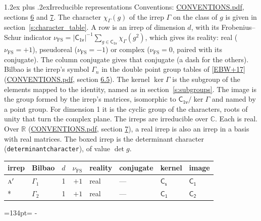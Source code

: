 \documentclass[10pt,a4paper]{article}
\makeatletter
\renewcommand\section{\@startsection{section}{1}{\z@}{-3ex plus -1ex minus -.2ex}%
  {1.2ex plus .2ex}{\normalfont\large\sffamily\bfseries\color{parttitle}}}
\newcommand{\needspace}[1]{\par\penalty-100\begingroup\dimen0=#1\relax\dimen2=\pagegoal
  \advance\dimen2-\pagetotal\ifdim\dimen0>\dimen2\relax\ifdim\dimen2>0pt\vfil\break\fi\fi
  \endgroup}
\numberwithin{equation}{section}
\newcommand{\grp}[1]{\mathsf{#1}}
\newcommand{\irr}[1]{\text{\normalfont\scshape #1}}
\newcommand{\detbox}[1]{{\setlength{\fboxsep}{1pt}\fbox{#1}}}
\newcommand{\irchar}[1]{\chi_{#1}}
\newcommand{\fsind}{\nu_{\mathrm{FS}}}
\makeatother
\begin{document}
\section{Irreducible representations}\label{s:irreps}
Conventions: \href{../../CONVENTIONS.pdf}{CONVENTIONS.pdf}, sections \href{../../CONVENTIONS.pdf\#conv.6}{6} and \href{../../CONVENTIONS.pdf\#conv.7}{7}.
\leavevmode\label{n:function.character}\label{n:irrep.Gamma}The character $\irchar{\Gamma}(g)$ of the irrep $\Gamma$ on the class of $g$ is given in section~\ref{s:character_table}.
\leavevmode\label{n:index.dimension}\label{n:index.frobenius}\label{n:head.irrep}\label{n:head.reality}A row is an irrep of dimension $d$, with its Frobenius--Schur indicator $\fsind = |\grp{C_{1v}}|^{-1}\allowbreak\sum_{g\in\grp{C_{1v}}}\irchar{\Gamma}(g^2)$, which gives its reality: real ($\fsind = +1$), pseudoreal ($\fsind = -1$) or complex ($\fsind = 0$, paired with its conjugate). \label{n:head.conjugate}The column conjugate gives that conjugate (a dash for the others). \label{n:head.bilbao}\label{n:irrep.alias.gamma}Bilbao is the irrep's symbol $\Gamma_n$ in the double point group tables of [\href{../../../REFERENCES.pdf\#ref.EBW+17}{EBW+17}] (\href{../../CONVENTIONS.pdf}{CONVENTIONS.pdf}, section \href{../../CONVENTIONS.pdf\#conv.6.5}{6.5}). \label{n:head.kernel}The kernel $\ker\Gamma$ is the subgroup of the elements mapped to the identity, named as in section~\ref{s:subgroups}. \label{n:head.image}The image is the group formed by the irrep's matrices, isomorphic to $\grp{C_{1v}}/\ker\Gamma$ and named by a point group. For dimension 1 it is the cyclic group of the characters, roots of unity that turn the complex plane. The irreps are irreducible over $\mathbb{C}$. Each is real. Over $\mathbb{R}$ (\href{../../CONVENTIONS.pdf}{CONVENTIONS.pdf}, section \href{../../CONVENTIONS.pdf\#conv.7}{7}), a real irrep is also an irrep in a basis with real matrices. \label{n:mark.determinant}The boxed irrep is the determinant character (\texttt{determinantcharacter}), of value $\det g$.
\setlength{\emergencystretch}{2em}\par\setlength{\emergencystretch}{0pt}
{\small\renewcommand{\arraystretch}{1.25}\begin{longtable}{@{}llrrllll@{}}\toprule
irrep & Bilbao & $d$ & $\fsind$ & reality & conjugate & kernel & image\\\midrule\endhead
\bottomrule\endfoot\endlastfoot
$\irr{a}'$ & $\Gamma_{1}$ & 1 & $+1$ & real & --- & \href{C1v.pdf}{$\grp{C_{s}}$} & \href{C1.pdf}{$\grp{C_{1}}$}\\*
\detbox{$\irr{a}''$} & $\Gamma_{2}$ & 1 & $+1$ & real & --- & \href{C1.pdf}{$\grp{C_{1}}$} & \href{C2.pdf}{$\grp{C_{2}}$}\\
\bottomrule\end{longtable}}
\needspace{134pt}
\end{document}
